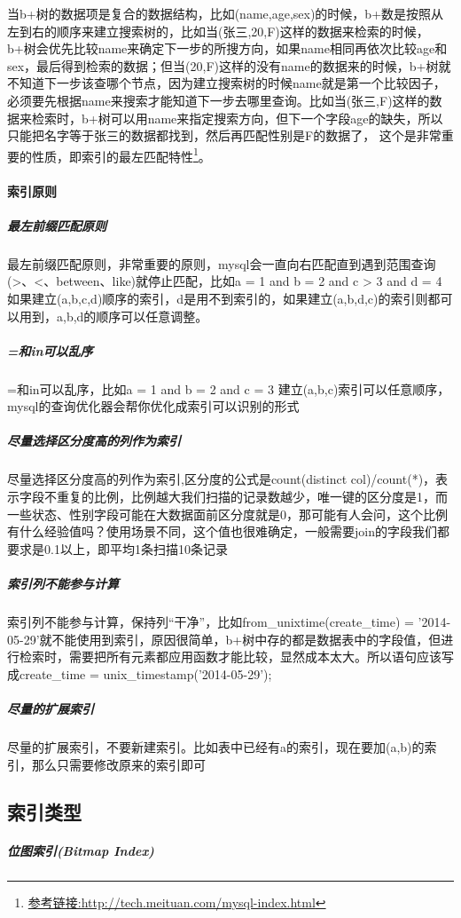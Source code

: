 \documentclass[letter]{book}
\begin{document}
当b+树的数据项是复合的数据结构，比如(name,age,sex)的时候，b+数是按照从左到右的顺序来建立搜索树的，比如当(张三,20,F)这样的数据来检索的时候，b+树会优先比较name来确定下一步的所搜方向，如果name相同再依次比较age和sex，最后得到检索的数据；但当(20,F)这样的没有name的数据来的时候，b+树就不知道下一步该查哪个节点，因为建立搜索树的时候name就是第一个比较因子，必须要先根据name来搜索才能知道下一步去哪里查询。比如当(张三,F)这样的数据来检索时，b+树可以用name来指定搜索方向，但下一个字段age的缺失，所以只能把名字等于张三的数据都找到，然后再匹配性别是F的数据了， 这个是非常重要的性质，即索引的最左匹配特性\footnote{\url{参考链接:http://tech.meituan.com/mysql-index.html}}。

\paragraph{索引原则}

\subparagraph{最左前缀匹配原则}最左前缀匹配原则，非常重要的原则，mysql会一直向右匹配直到遇到范围查询(>、<、between、like)就停止匹配，比如a = 1 and b = 2 and c > 3 and d = 4 如果建立(a,b,c,d)顺序的索引，d是用不到索引的，如果建立(a,b,d,c)的索引则都可以用到，a,b,d的顺序可以任意调整。

\subparagraph{=和in可以乱序}=和in可以乱序，比如a = 1 and b = 2 and c = 3 建立(a,b,c)索引可以任意顺序，mysql的查询优化器会帮你优化成索引可以识别的形式

\subparagraph{尽量选择区分度高的列作为索引}尽量选择区分度高的列作为索引,区分度的公式是count(distinct col)/count(*)，表示字段不重复的比例，比例越大我们扫描的记录数越少，唯一键的区分度是1，而一些状态、性别字段可能在大数据面前区分度就是0，那可能有人会问，这个比例有什么经验值吗？使用场景不同，这个值也很难确定，一般需要join的字段我们都要求是0.1以上，即平均1条扫描10条记录

\subparagraph{索引列不能参与计算}索引列不能参与计算，保持列“干净”，比如from\_unixtime(create\_time) = ’2014-05-29’就不能使用到索引，原因很简单，b+树中存的都是数据表中的字段值，但进行检索时，需要把所有元素都应用函数才能比较，显然成本太大。所以语句应该写成create\_time = unix\_timestamp(’2014-05-29’);

\subparagraph{尽量的扩展索引}尽量的扩展索引，不要新建索引。比如表中已经有a的索引，现在要加(a,b)的索引，那么只需要修改原来的索引即可

\subsection{索引类型}

\subparagraph{位图索引(Bitmap Index)}
\end{document}
